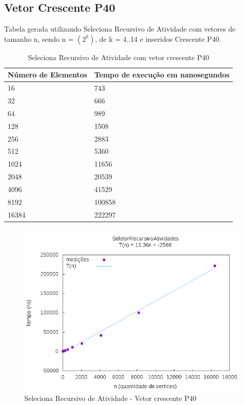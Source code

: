 \documentclass[12pt,a4paper,twoside]{report}
\begin{document}
\subsection{Vetor Crescente P40}
Tabela gerada utilizando Seleciona Recursivo de Atividade com vetores de tamanho n, sendo n = $(2^k)$, de k = 4..14 e inseridos Crescente P40.
\begin{table}[H]
\centering
\caption{Seleciona Recursivo de Atividade com vetor crescente P40}
\label{my-label}
\begin{tabular}{|l|l|}
\hline
\multicolumn{1}{|c|}{\textbf{Número de Elementos}} & \multicolumn{1}{c|}{\textbf{Tempo de execução em nanosegundos}} \\ \hline
16 & 743 \\ \hline
32 & 666 \\ \hline
64 & 989 \\ \hline
128 & 1508 \\ \hline
256 & 2883 \\ \hline
512 & 5360 \\ \hline
1024 & 11656 \\ \hline
2048 & 20539 \\ \hline
4096 & 41529 \\ \hline
8192 & 100858 \\ \hline
16384 & 222297 \\ \hline

\end{tabular}
\end{table}

\begin{figure}[H]
    \centering
    \includegraphics[width=0.7\linewidth]{graficos/SeletorRecursivoAtividades/Crescente P40/SelecionaAleatorizado.png}
  \caption{Seleciona Recursivo de Atividade - Vetor crescente P40}
\end{figure}
\end{document}
